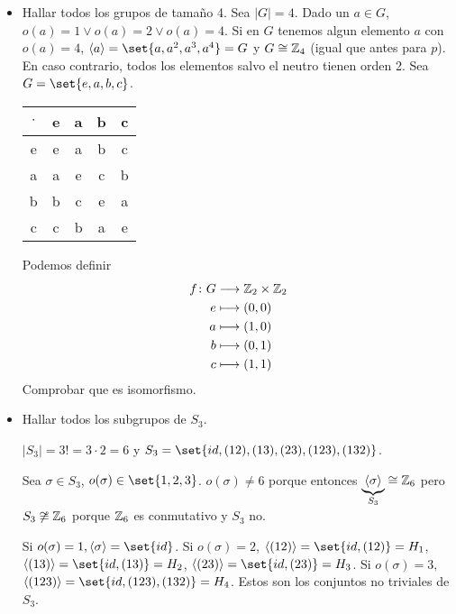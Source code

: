 \begin{example}
\begin{itemize}
		\item Hallar todos los grupos de tamaño 4. Sea \(|G| = 4 \). Dado un \(a \in G \), \(o(a) = 1 \vee o(a) = 2 \vee o(a) = 4 \). Si en \(G \) tenemos algun elemento \(a \) con \(o(a) = 4 \), \(\langle a \rangle = \set{a,a^{2}, a^{3}, a^{4}   } = G\) y \(G \cong \mathbb{Z}_4 \) (igual que antes para \(p \)).
		      En caso contrario, todos los elementos salvo el neutro tienen orden 2. Sea \(G = \set{e,a,b,c}\).
		      \begin{table}[H]
			      \centering
			      \begin{tabular}{|c|c|c|c|c|}
				      \hline
				      \(\cdot\) & e & a & b & c \\ \hline
				      \hline
				      e         & e & a & b & c \\ \hline
				      a         & a & e & c & b \\ \hline
				      b         & b & c & e & a \\ \hline
				      c         & c & b & a & e \\
				      \hline
			      \end{tabular}
		      \end{table}
		      Podemos definir
		      \[
			      \begin{aligned}
				      f \colon G & \longrightarrow \mathbb{Z}_2 \times \mathbb{Z}_2 \\
				      e          & \longmapsto  (0,0 )              \\
				      a          & \longmapsto  (1,0 )              \\
				      b          & \longmapsto  (0,1 )              \\
				      c          & \longmapsto  (1,1 )
			      \end{aligned}
		      \]
		      Comprobar que es isomorfismo.
		      
		\item Hallar todos los subgrupos de \(S_3 \).
		      
		      \(|S_3| = 3! = 3 \cdot 2 = 6 \) y \(S_3 = \set{id, (12), (13), (23), (123), (132)}\).
		      
		      Sea \(\sigma \in S_3\), \(o(\sigma) \in \set{1,2,3}\). \(o(\sigma) \neq 6 \) porque entonces \(\underbrace{\langle \sigma \rangle}_{S_3} \cong \mathbb{Z}_6 \) pero \(S_3 \not \cong \mathbb{Z}_6 \) porque \(\mathbb{Z}_6 \) es conmutativo y \(S_3 \) no.
		      
		      Si \(o(\sigma) = 1, \langle \sigma \rangle = \set{id } \). Si \(o(\sigma) = 2 \), \(\langle (12) \rangle = \set{id, (12)} = H_1\), \(\langle (13) \rangle = \set{id, (13)} = H_2\), \(\langle (23) \rangle = \set{id, (23)} = H_3\). Si \(o(\sigma) = 3 ,\) \(\langle (123) \rangle = \set{id, (123), (132)} = H_4\). Estos son los conjuntos no triviales de \(S_3 \).
	\end{itemize}
\end{example}

